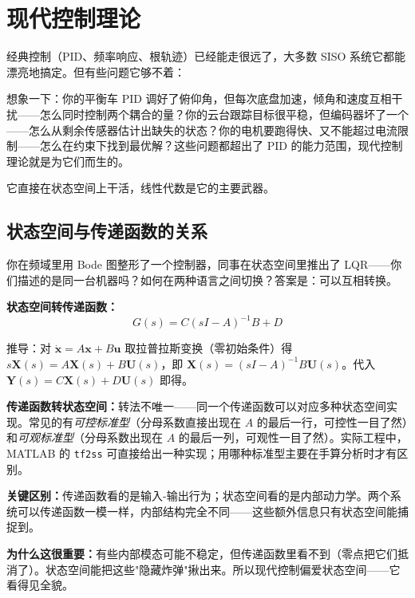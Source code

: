 \section{现代控制理论}

经典控制（PID、频率响应、根轨迹）已经能走很远了，大多数 SISO 系统它都能漂亮地搞定。但有些问题它够不着：

想象一下：你的平衡车 PID 调好了俯仰角，但每次底盘加速，倾角和速度互相干扰——怎么同时控制两个耦合的量？你的云台跟踪目标很平稳，但编码器坏了一个——怎么从剩余传感器估计出缺失的状态？你的电机要跑得快、又不能超过电流限制——怎么在约束下找到最优解？这些问题都超出了 PID 的能力范围，现代控制理论就是为它们而生的。

它直接在状态空间上干活，线性代数是它的主要武器。

\subsection{状态空间与传递函数的关系}

你在频域里用 Bode 图整形了一个控制器，同事在状态空间里推出了 LQR——你们描述的是同一台机器吗？如何在两种语言之间切换？答案是：可以互相转换。

\textbf{状态空间转传递函数：}
\begin{equation}
G(s) = C(sI - A)^{-1}B + D
\end{equation}

推导：对 $\dot{\mathbf{x}} = A\mathbf{x} + B\mathbf{u}$ 取拉普拉斯变换（零初始条件）得 $s\mathbf{X}(s) = A\mathbf{X}(s) + B\mathbf{U}(s)$，即 $\mathbf{X}(s) = (sI - A)^{-1}B\mathbf{U}(s)$。代入 $\mathbf{Y}(s) = C\mathbf{X}(s) + D\mathbf{U}(s)$ 即得。

\textbf{传递函数转状态空间：}转法不唯一——同一个传递函数可以对应多种状态空间实现。常见的有\textit{可控标准型}（分母系数直接出现在 $A$ 的最后一行，可控性一目了然）和\textit{可观标准型}（分母系数出现在 $A$ 的最后一列，可观性一目了然）。实际工程中，MATLAB 的 \texttt{tf2ss} 可直接给出一种实现；用哪种标准型主要在手算分析时才有区别。

\textbf{关键区别：}传递函数看的是输入-输出行为；状态空间看的是内部动力学。两个系统可以传递函数一模一样，内部结构完全不同——这些额外信息只有状态空间能捕捉到。

\textbf{为什么这很重要：}有些内部模态可能不稳定，但传递函数里看不到（零点把它们抵消了）。状态空间能把这些"隐藏炸弹"揪出来。所以现代控制偏爱状态空间——它看得见全貌。

